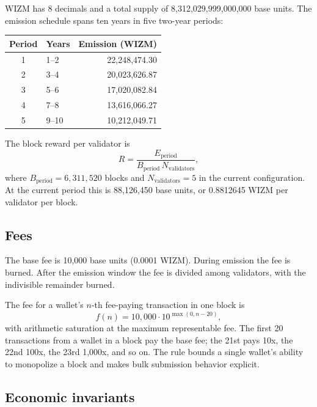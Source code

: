 \documentclass[11pt,a4paper]{article}
\begin{document}
WIZM has 8 decimals and a total supply of 8,312,029,999,000,000 base units. The
emission schedule spans ten years in five two-year periods:

\begin{center}
\begin{tabular}{@{}clr@{}}
\toprule
Period & Years & Emission (WIZM) \\
\midrule
1 & 1--2 & 22,248,474.30 \\
2 & 3--4 & 20,023,626.87 \\
3 & 5--6 & 17,020,082.84 \\
4 & 7--8 & 13,616,066.27 \\
5 & 9--10 & 10,212,049.71 \\
\bottomrule
\end{tabular}
\end{center}

The block reward per validator is
\begin{equation}
  R = \frac{E_{\mathrm{period}}}{B_{\mathrm{period}}\,N_{\mathrm{validators}}},
\end{equation}
where $B_{\mathrm{period}}=6{,}311{,}520$ blocks and $N_{\mathrm{validators}}=5$
in the current configuration. At the current period this is 88,126,450 base
units, or 0.8812645 WIZM per validator per block.

\subsection{Fees}

The base fee is 10,000 base units (0.0001 WIZM). During emission the fee is
burned. After the emission window the fee is divided among validators, with the
indivisible remainder burned.

The fee for a wallet's $n$-th fee-paying transaction in one block is
\begin{equation}
  f(n) = 10{,}000 \cdot 10^{\max(0,n-20)},
\end{equation}
with arithmetic saturation at the maximum representable fee. The first 20
transactions from a wallet in a block pay the base fee; the 21st pays 10x, the
22nd 100x, the 23rd 1,000x, and so on. The rule bounds a single wallet's
ability to monopolize a block and makes bulk submission behavior explicit.

\subsection{Economic invariants}
\end{document}
